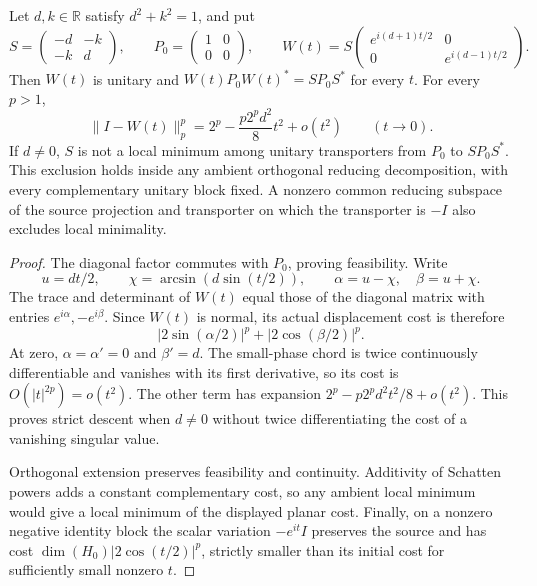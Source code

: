 \begin{proposition}
\label{prop:schatten-reflecting-descent}
Let $d,k\in\mathbb R$ satisfy $d^2+k^2=1$, and put
\[
 S=\begin{pmatrix}-d&-k\\-k&d\end{pmatrix},\qquad
 P_0=\begin{pmatrix}1&0\\0&0\end{pmatrix},\qquad
 W(t)=S\begin{pmatrix}
   e^{i(d+1)t/2}&0\\0&e^{i(d-1)t/2}
 \end{pmatrix}.
\]
Then $W(t)$ is unitary and $W(t)P_0W(t)^*=SP_0S^*$ for every $t$.
For every $p>1$,
\[
 \|I-W(t)\|_p^p
   =2^p-\frac{p2^p d^2}{8}t^2+o(t^2)\qquad(t\to0).
\]
If $d\ne0$, $S$ is not a local minimum among unitary transporters
from $P_0$ to $SP_0S^*$. This exclusion holds inside any ambient
orthogonal reducing decomposition, with every complementary unitary
block fixed. A nonzero common reducing subspace of the source projection
and transporter on which the transporter is $-I$ also excludes local
minimality.
\end{proposition}

\begin{proof}
The diagonal factor commutes with $P_0$, proving feasibility. Write
\[
 u=dt/2,\qquad \chi=\arcsin(d\sin(t/2)),\qquad
 \alpha=u-\chi,\quad \beta=u+\chi.
\]
The trace and determinant of $W(t)$ equal those of the diagonal
matrix with entries $e^{i\alpha},-e^{i\beta}$. Since $W(t)$ is
normal, its actual displacement cost is therefore
\[
 |2\sin(\alpha/2)|^p+|2\cos(\beta/2)|^p.
\]
At zero, $\alpha=\alpha'=0$ and $\beta'=d$. The small-phase chord
is twice continuously differentiable and vanishes with its first
derivative, so its cost is $O(|t|^{2p})=o(t^2)$. The other term has
expansion $2^p-p2^p d^2t^2/8+o(t^2)$. This proves strict descent
when $d\ne0$ without twice differentiating the cost of a vanishing
singular value.

Orthogonal extension preserves feasibility and continuity. Additivity
of Schatten powers adds a constant complementary cost, so any ambient
local minimum would give a local minimum of the displayed planar cost.
Finally, on a nonzero negative identity block the scalar variation
$-e^{it}I$ preserves the source and has cost
$\dim(H_0)|2\cos(t/2)|^p$, strictly smaller than its initial cost for
sufficiently small nonzero $t$.
\end{proof}

